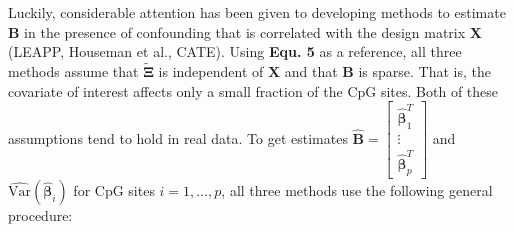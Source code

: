 \documentclass{article}
\begin{document}
\indent Luckily, considerable attention has been given to developing methods to estimate $\bm{B}$ in the presence of confounding that is correlated with the design matrix $\bm{X}$ (LEAPP, Houseman et al., CATE). Using \textbf{Equ. 5} as a reference, all three methods assume that $\tilde{\bm{\Xi}}$ is independent of $\bm{X}$ and that $\bm{B}$ is sparse. That is, the covariate of interest affects only a small fraction of the CpG sites. Both of these assumptions tend to hold in real data. To get estimates $\hat{\bm{B}} = \left[ \begin{matrix}
\hat{\bm{\beta}}_1^T\\
\vdots\\
\hat{\bm{\beta}}_p^T
\end{matrix} \right]$ and $\hat{\text{Var}}\left( \hat{\bm{\beta}}_i \right)$ for CpG sites $i = 1, \ldots, p$, all three methods use the following general procedure:
\end{document}
